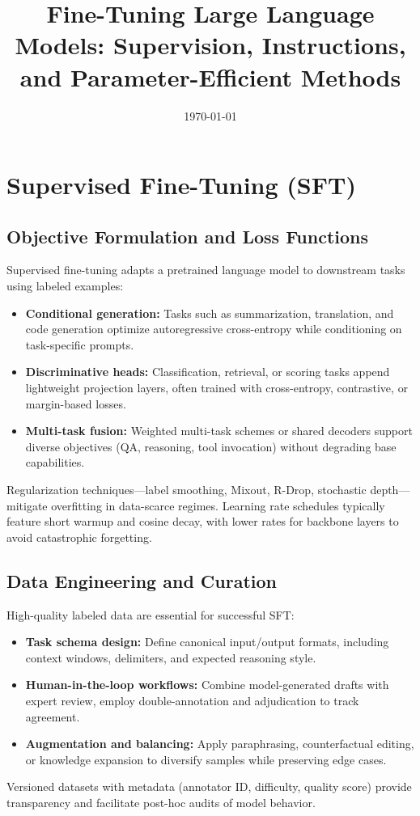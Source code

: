 \documentclass{article}
\title{Fine-Tuning Large Language Models: Supervision, Instructions, and Parameter-Efficient Methods}
\author{}
\date{\today}
\begin{document}
\maketitle

\section{Supervised Fine-Tuning (SFT)}
\subsection{Objective Formulation and Loss Functions}
Supervised fine-tuning adapts a pretrained language model to downstream tasks using labeled examples:
\begin{itemize}
  \item \textbf{Conditional generation:} Tasks such as summarization, translation, and code generation optimize autoregressive cross-entropy while conditioning on task-specific prompts.
  \item \textbf{Discriminative heads:} Classification, retrieval, or scoring tasks append lightweight projection layers, often trained with cross-entropy, contrastive, or margin-based losses.
  \item \textbf{Multi-task fusion:} Weighted multi-task schemes or shared decoders support diverse objectives (QA, reasoning, tool invocation) without degrading base capabilities.
\end{itemize}
Regularization techniques—label smoothing, Mixout, R-Drop, stochastic depth—mitigate overfitting in data-scarce regimes. Learning rate schedules typically feature short warmup and cosine decay, with lower rates for backbone layers to avoid catastrophic forgetting.

\subsection{Data Engineering and Curation}
High-quality labeled data are essential for successful SFT:
\begin{itemize}
  \item \textbf{Task schema design:} Define canonical input/output formats, including context windows, delimiters, and expected reasoning style.
  \item \textbf{Human-in-the-loop workflows:} Combine model-generated drafts with expert review, employ double-annotation and adjudication to track agreement.
  \item \textbf{Augmentation and balancing:} Apply paraphrasing, counterfactual editing, or knowledge expansion to diversify samples while preserving edge cases.
\end{itemize}
Versioned datasets with metadata (annotator ID, difficulty, quality score) provide transparency and facilitate post-hoc audits of model behavior.
\end{document}
